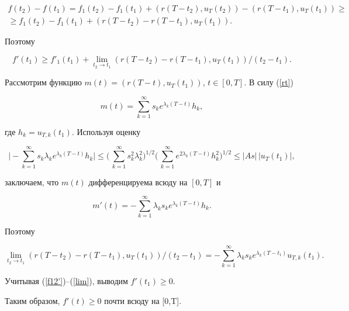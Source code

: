 \begin{pf}
\begin{multline*}
f(t_2)-f(t_1)=f_1(t_2)-f_1(t_1)+(r(T-t_2),u_T(t_2))


-(r(T-t_1),u_T(t_1))\ge \\


\ge f_1(t_2)-f_1(t_1)+(r(T-t_2)-r(T-t_1),u_T(t_1)).


\end{multline*}


Поэтому


\begin{equation} \label{f'}


f'(t_1)\ge f'_1(t_1)+\lim_{t_2\to t_1}


(r(T-t_2)-r(T-t_1),u_T(t_1))/(t_2-t_1).


\end{equation}


Рассмотрим функцию $m(t)=(r(T-t),u_T(t_1))$, $t\in[0,T]$. В силу (\ref{rt})


$$


m(t)= \sum_{k=1}^\infty  s_k e^{\lambda_k (T-t)} h_k,


$$


где $h_k=u_{T,k}(t_1)$. Используя оценку


$$


\bigg|-\sum_{k=1}^\infty s_k\lambda_k e^{\lambda_k (T-t)} h_k\bigg|\le


\bigg(\,\sum_{k=1}^\infty  s_k^2\lambda_k^2\bigg)^{1/2}


\bigg(\,\sum_{k=1}^\infty  e^{2\lambda_k(T-t)}h_k^2\bigg)^{1/2}\le


|As|\,|u_T(t_1)|,


$$


заключаем, что $m(t)$ дифференцируема всюду на $[0,T]$ и


$$


m'(t)=- \sum_{k=1}^\infty \lambda_k s_k e^{\lambda_k (T-t)} h_k.


$$


Поэтому


\begin{equation} \label{lim}


\lim_{t_2\to t_1}(r(T-t_2)-r(T-t_1),u_T(t_1))/(t_2-t_1)=


-\sum_{k=1}^\infty \lambda_k s_k e^{\lambda_k {(T-t_1)}} u_{T,k}(t_1).


\end{equation}


Учитывая (\ref{f12'})--(\ref{lim}), выводим $f'(t_1)\ge0$.


Таким образом, $f'(t)\ge0$ почти всюду на [0,T]. 



\end{pf}
